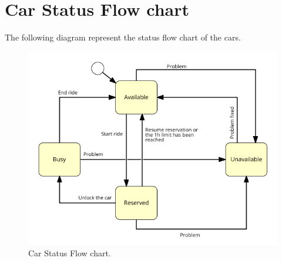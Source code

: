 \section{Car Status Flow chart}
The following diagram represent the status flow chart of the cars.

\begin{figure}[H]
	\centering
	\includegraphics[width=\textwidth,height=\dimexpr\textheight-4\baselineskip-\abovecaptionskip-\belowcaptionskip\relax,keepaspectratio]{models/car_status.png}
	\caption{Car Status Flow chart.}
	\label{fig:high_components}
\end{figure}